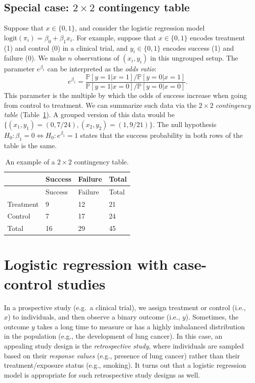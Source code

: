 \documentclass[
  11pt,
  letterpaper,
  oneside]{book}
\theoremstyle{plain}
\theoremstyle{plain}
\theoremstyle{definition}
\theoremstyle{definition}
\theoremstyle{plain}
\theoremstyle{remark}
\begin{document}
\hypertarget{sec-2x2-contingency}{%
\subsection{\texorpdfstring{Special case: \(2 \times 2\) contingency
table}{Special case: 2 \textbackslash times 2 contingency table}}\label{sec-2x2-contingency}}

Suppose that \(x \in \{0,1\}\), and consider the logistic regression
model \(\text{logit}(\pi_i) = \beta_0 + \beta_1 x_i\). For example,
suppose that \(x \in \{0,1\}\) encodes treatment (1) and control (0) in
a clinical trial, and \(y_i \in \{0,1\}\) encodes success (1) and
failure (0). We make \(n\) observations of \((x_i, y_i)\) in this
ungrouped setup. The parameter \(e^{\beta_1}\) can be interpreted as the
\emph{odds ratio}: \[
e^{\beta_1} = \frac{\mathbb{P}[y = 1|x=1]/\mathbb{P}[y = 0|x=1]}{\mathbb{P}[y = 1|x=0]/\mathbb{P}[y = 0|x=0]}.
\] This parameter is the multiple by which the odds of success increase
when going from control to treatment. We can summarize such data via the
\(2 \times 2\) \emph{contingency table} (Table~\ref{tbl-2-by-2-table}).
A grouped version of this data would be
\(\{(x_1, y_1) = (0, 7/24), (x_2, y_2) = (1, 9/21)\}\). The null
hypothesis \(H_0: \beta_1 = 0 \Longleftrightarrow H_0: e^{\beta_1} = 1\)
states that the success probability in both rows of the table is the
same.

\hypertarget{tbl-2-by-2-table}{}
\begin{longtable}[]{@{}llll@{}}
\caption{\label{tbl-2-by-2-table}An example of a \(2 \times 2\)
contingency table.}\tabularnewline
\toprule\noalign{}
& Success & Failure & Total \\
\midrule\noalign{}
\endfirsthead
\toprule\noalign{}
& Success & Failure & Total \\
\midrule\noalign{}
\endhead
\bottomrule\noalign{}
\endlastfoot
Treatment & 9 & 12 & 21 \\
Control & 7 & 17 & 24 \\
Total & 16 & 29 & 45 \\
\end{longtable}

\hypertarget{sec-logistic-case-control}{%
\section{Logistic regression with case-control
studies}\label{sec-logistic-case-control}}

In a prospective study (e.g.~a clinical trial), we assign treatment or
control (i.e., \(x\)) to individuals, and then observe a binary outcome
(i.e., \(y\)). Sometimes, the outcome \(y\) takes a long time to measure
or has a highly imbalanced distribution in the population (e.g., the
development of lung cancer). In this case, an appealing study design is
the \emph{retrospective study}, where individuals are sampled based on
their \emph{response values} (e.g., presence of lung cancer) rather than
their treatment/exposure status (e.g., smoking). It turns out that a
logistic regression model is appropriate for such retrospective study
designs as well.
\end{document}
